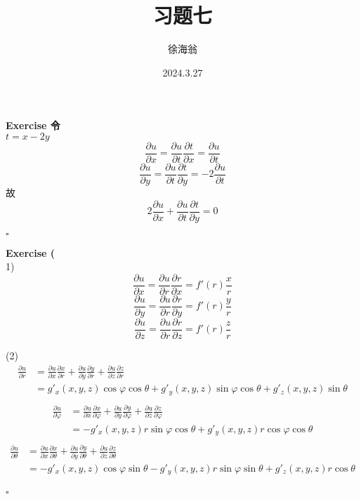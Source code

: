 \documentclass{article}
\title{习题七}
\author{徐海翁}
\date{2024.3.27}
\newenvironment{exercise}[1]{%
{\textbf{Exercise #1} \\ 
    }
}{
  \hfill $\square$ 
  \par\bigskip 
}
\begin{document}
\begin{CJK}{UTF8}{gkai}

\maketitle
\tableofcontents

\begin{exercise}{8}
    令$t = x - 2y$
    \[\frac{\partial u}{\partial x} = \frac{\partial u}{\partial t} \frac{\partial t}{\partial x} = \frac{\partial u}{\partial t}\]
    \[\frac{\partial u}{\partial y} = \frac{\partial u}{\partial t} \frac{\partial t}{\partial y} = -2 \frac{\partial u}{\partial t}\]
    故
    \[2 \frac{\partial u}{\partial x} + \frac{\partial u}{\partial t} \frac{\partial t}{\partial y} = 0\]
\end{exercise}

\begin{exercise}{9}
    (1)
    \[\frac{\partial u}{\partial x} = \frac{\partial u}{\partial r} \frac{\partial r}{\partial x} = f'(r) \frac{x}{r}\]
    \[\frac{\partial u}{\partial y} = \frac{\partial u}{\partial r} \frac{\partial r}{\partial y} = f'(r) \frac{y}{r}\]
    \[\frac{\partial u}{\partial z} = \frac{\partial u}{\partial r} \frac{\partial r}{\partial z} = f'(r) \frac{z}{r}\]

    (2)
    \[\begin{aligned}
        \frac{\partial u}{\partial r} &= \frac{\partial u}{\partial x} \frac{\partial x}{\partial r} + \frac{\partial u}{\partial y} \frac{\partial y}{\partial r} + \frac{\partial u}{\partial z} \frac{\partial z}{\partial r}  \\
        &= g'_x(x,y,z)\cos \varphi \cos \theta + g'_y(x,y,z)\sin \varphi \cos \theta + g'_z(x,y,z)\sin \theta\\
    \end{aligned}\]
    \[\begin{aligned}
        \frac{\partial u}{\partial \varphi} &= \frac{\partial u}{\partial x} \frac{\partial x}{\partial \varphi} + \frac{\partial u}{\partial y} \frac{\partial y}{\partial \varphi} + \frac{\partial u}{\partial z} \frac{\partial z}{\partial \varphi}  \\
        &= - g'_x(x,y,z) r \sin \varphi \cos \theta + g'_y(x,y,z) r \cos \varphi \cos \theta \\
    \end{aligned}\]
    \[\begin{aligned}
        \frac{\partial u}{\partial \theta} &= \frac{\partial u}{\partial x} \frac{\partial x}{\partial \theta} + \frac{\partial u}{\partial y} \frac{\partial y}{\partial \theta} + \frac{\partial u}{\partial z} \frac{\partial z}{\partial \theta}  \\
        &= - g'_x(x,y,z)\cos \varphi \sin \theta - g'_y(x,y,z) r \sin \varphi \sin \theta + g'_z(x,y,z) r \cos \theta\\
    \end{aligned}\]


\end{exercise}
\end{CJK}
\end{document}

